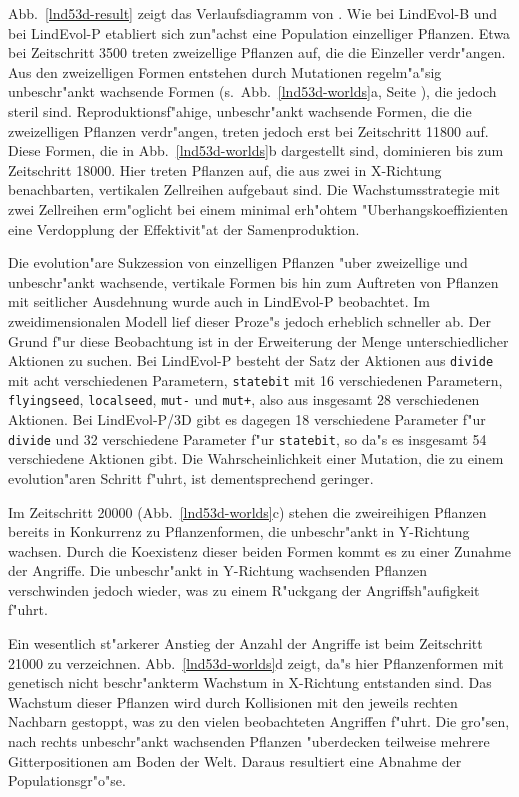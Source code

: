 Abb.\ \ref{lnd53d-result} zeigt das Verlaufsdiagramm von . Wie bei LindEvol-B und bei LindEvol-P
etabliert sich zun"achst eine Population einzelliger Pflanzen.
Etwa bei Zeitschritt 3500 treten zweizellige Pflanzen auf, die die Einzeller verdr"angen. Aus den zweizelligen Formen
entstehen durch Mutationen regelm"a"sig unbeschr"ankt wachsende Formen (s.\ Abb.\ \ref{lnd53d-worlds}a, Seite \pageref{lnd53d-worlds}),
die jedoch steril sind. Reproduktionsf"ahige,
unbeschr"ankt wachsende Formen, die die zweizelligen Pflanzen verdr"angen, treten jedoch erst bei Zeitschritt 11800 auf.
Diese Formen, die in Abb.\ \ref{lnd53d-worlds}b dargestellt sind, dominieren bis zum Zeitschritt 18000. Hier treten
Pflanzen auf, die aus zwei in X-Richtung benachbarten, vertikalen Zellreihen aufgebaut sind.
Die Wachstumsstrategie mit zwei Zellreihen erm"oglicht bei einem minimal erh"ohtem
"Uberhangskoeffizienten eine Verdopplung der Effektivit"at der Samenproduktion.

\begin{sloppypar}
Die evolution"are Sukzession von einzelligen Pflanzen "uber zweizellige und unbeschr"ankt wachsende, vertikale Formen
bis hin zum Auftreten von Pflanzen mit seitlicher Ausdehnung wurde auch in LindEvol-P beobachtet. Im zweidimensionalen
Modell lief dieser Proze"s jedoch erheblich schneller ab. Der Grund f"ur diese Beobachtung ist in der Erweiterung
der Menge unterschiedlicher Aktionen zu suchen. Bei LindEvol-P besteht der Satz der Aktionen aus \verb|divide| mit
acht verschiedenen Parametern, \verb|statebit| mit 16 verschiedenen Parametern, \verb|flyingseed|, \verb|localseed|,
\verb|mut-| und \verb|mut+|, also aus insgesamt 28 verschiedenen Aktionen. Bei LindEvol-P/3D gibt es dagegen 18
verschiedene Parameter f"ur \verb|divide| und 32 verschiedene Parameter f"ur \verb|statebit|, so da"s es insgesamt
54 verschiedene Aktionen gibt. Die Wahrscheinlichkeit einer Mutation, die zu einem evolution"aren Schritt f"uhrt,
ist dementsprechend geringer.
\end{sloppypar}

Im Zeitschritt 20000 (Abb.\ \ref{lnd53d-worlds}c) stehen die zweireihigen Pflanzen bereits in Konkurrenz zu Pflanzenformen,
die unbeschr"ankt in Y-Richtung wachsen. Durch die Koexistenz dieser beiden Formen kommt es zu einer Zunahme der
Angriffe. Die unbeschr"ankt in Y-Richtung wachsenden Pflanzen verschwinden jedoch wieder, was zu einem R"uckgang
der Angriffsh"aufigkeit f"uhrt.

Ein wesentlich st"arkerer Anstieg der Anzahl der Angriffe ist beim Zeitschritt 21000 zu verzeichnen. Abb.\ \ref{lnd53d-worlds}d
zeigt, da"s hier Pflanzenformen mit genetisch nicht beschr"ankterm Wachstum in X-Richtung entstanden sind.
Das Wachstum dieser Pflanzen wird durch Kollisionen mit den jeweils rechten Nachbarn gestoppt, was zu den vielen
beobachteten Angriffen f"uhrt. Die gro"sen, nach rechts unbeschr"ankt wachsenden Pflanzen "uberdecken teilweise mehrere
Gitterpositionen am Boden der Welt. Daraus resultiert eine Abnahme der Populationsgr"o"se.

